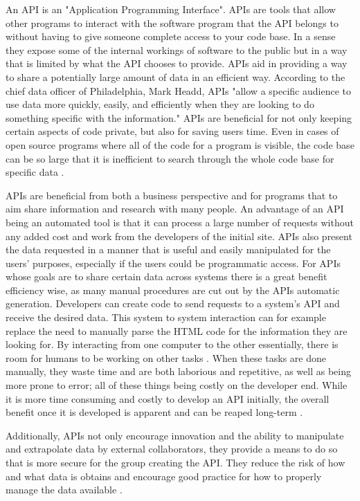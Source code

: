 		An API is an "Application Programming Interface". APIs are tools that 
		allow other programs to interact with the software program that the API 
		belongs to without having to give someone complete access to your code 
		base. In a sense they expose some of the internal workings of software 
		to the public but in a way that is limited by what the API chooses to 
		provide. APIs aid in providing a way to share a potentially large 
		amount of data in an efficient way. According to the chief data officer 
		of Philadelphia, Mark Headd, APIs "allow a specific audience to use data
		more quickly, easily, and efficiently when they are looking to do 
		something specific with the information." APIs are beneficial for not 
		only keeping certain aspects of code private, but also for saving users 
		time. Even in cases of open source programs where all of the code for a 
		program is visible, the code base can be so large that it is inefficient 
		to search through the whole code base for specific data \cite{govapi}. 

		APIs are beneficial from both a business perspective and for programs 
		that to aim share information and research with many people. An 
		advantage of an API being an automated tool is that it can process a 
		large number of requests without any added cost and work from the 
		developers of the initial site. APIs also present the data requested in 
		a manner that is useful and easily manipulated for the users' purposes, 
		especially if the users could be programmatic access. For APIs whose 
		goals are to share certain data across systems there is a great benefit 
		efficiency wise, as many manual procedures are cut out by the APIs 
		automatic generation. Developers can create code to send requests to a system's API and receive the desired data. This system to system interaction can for example replace the need to manually parse the HTML code for the information they are looking for. By interacting from one computer to the other essentially, there is room for humans to be working on other tasks \cite{amazon}. When these tasks are done manually, they waste 
		time and are both laborious and repetitive, as well as being more prone 
		to error; all of these things being costly on the developer end. While 
		it is more time consuming and costly to develop an API initially, the 
		overall benefit once it is developed is apparent and can be reaped 
		long-term \cite{govapi}.

		Additionally, APIs not only encourage innovation and the ability to 
		manipulate and extrapolate data by external collaborators, they provide 
		a means to do so that is more secure for the group creating the API. 
		They reduce the risk of how and what data is obtains and encourage good 
		practice for how to properly manage the data available \cite{readwrite}.

